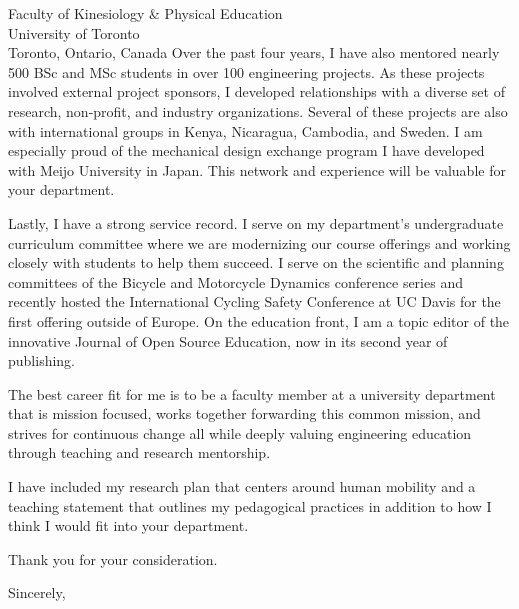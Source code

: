 \documentclass{letter}
\begin{document}
\begin{letter}{
  Faculty of Kinesiology \& Physical Education \\
  University of Toronto \\
  Toronto, Ontario, Canada
}
Over the past four years, I have also mentored nearly 500 BSc and MSc students
in over 100 engineering projects. As these projects involved external project
sponsors, I developed relationships with a diverse set of research, non-profit,
and industry organizations. Several of these projects are also with
international groups in Kenya, Nicaragua, Cambodia, and Sweden. I am especially
proud of the mechanical design exchange program I have developed with Meijo
University in Japan. This network and experience will be valuable for your
department.

Lastly, I have a strong service record. I serve on my department's
undergraduate curriculum committee where we are modernizing our course
offerings and working closely with students to help them succeed. I serve on
the scientific and planning committees of the Bicycle and Motorcycle Dynamics
conference series and recently hosted the International Cycling Safety
Conference at UC Davis for the first offering outside of Europe.  On the
education front, I am a topic editor of the innovative Journal of Open Source
Education, now in its second year of publishing.

The best career fit for me is to be a faculty member at a university department
that is mission focused, works together forwarding this common mission, and
strives for continuous change all while deeply valuing engineering education
through teaching and research mentorship.

I have included my research plan that centers around human mobility and a
teaching statement that outlines my pedagogical practices in addition to how I
think I would fit into your department.

Thank you for your consideration.

\closing{Sincerely,}

\end{letter}
\end{document}
